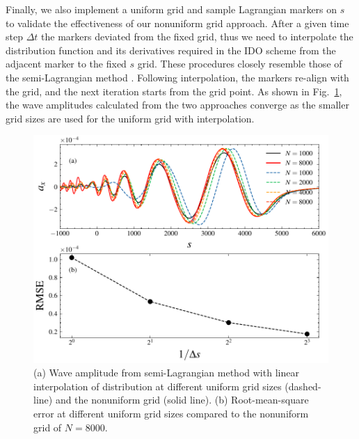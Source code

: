 Finally, we also implement a uniform grid and sample Lagrangian markers on $s$ to validate the effectiveness of our nonuniform grid approach.
After a given time step $\Delta t$ the markers deviated from the fixed grid, thus  we need to interpolate the distribution function and its derivatives required in the IDO scheme from the adjacent marker to the fixed $s$ grid.
These procedures closely resemble those of the semi-Lagrangian method \cite{sonnendrucker1999,cottet2018}. Following interpolation, the markers re-align with the grid, and the next iteration starts from the grid point.
As shown in Fig.~\ref{fig.cmp1}, the wave amplitudes calculated from  the two approaches converge  as the smaller grid sizes are used for the uniform grid with interpolation.  
\begin{figure}[htbp]
    \centering
    \includegraphics[scale=0.5]{cpc_img/fig_semiL.pdf}
    \caption{ (a) Wave amplitude from semi-Lagrangian method with linear interpolation of distribution at different uniform grid sizes (dashed-line) and the nonuniform grid (solid line).
    (b) Root-mean-square error at different uniform grid sizes compared to the 
    nonuniform grid of $N=8000$.
    }
    \label{fig.cmp1}
\end{figure}

